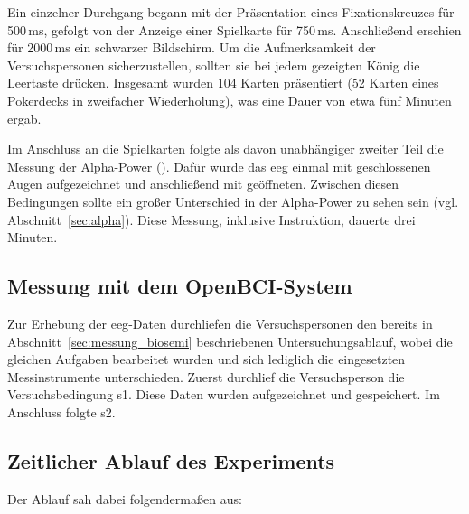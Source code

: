 Ein einzelner Durchgang begann mit der Präsentation eines Fixationskreuzes für 500\,ms, gefolgt von der Anzeige einer Spielkarte für 750\,ms. Anschließend erschien für 2000\,ms ein schwarzer Bildschirm. Um die Aufmerksamkeit der Versuchspersonen sicherzustellen, sollten sie bei jedem gezeigten König die Leertaste drücken. Insgesamt wurden 104 Karten präsentiert (52 Karten eines Pokerdecks in zweifacher Wiederholung), was eine Dauer von etwa fünf Minuten ergab.

Im Anschluss an die Spielkarten folgte als davon unabhängiger zweiter Teil die Messung der Alpha-Power (). Dafür wurde das \acrshort{eeg} einmal mit geschlossenen Augen aufgezeichnet und anschließend mit geöffneten. Zwischen diesen Bedingungen sollte ein großer Unterschied in der Alpha-Power zu sehen sein (vgl. Abschnitt~\ref{sec:alpha}). Diese Messung, inklusive Instruktion, dauerte drei Minuten.

    \subsection{Messung mit dem OpenBCI-System}

Zur Erhebung der \acrshort{eeg}-Daten durchliefen die Versuchspersonen den bereits in Abschnitt~\ref{sec:messung_biosemi} beschriebenen Untersuchungsablauf, wobei die gleichen Aufgaben bearbeitet wurden und sich lediglich die eingesetzten Messinstrumente unterschieden. Zuerst durchlief die Versuchsperson die Versuchsbedingung s1. Diese Daten wurden aufgezeichnet und gespeichert. Im Anschluss folgte s2.

    \subsection{Zeitlicher Ablauf des Experiments}

Der Ablauf sah dabei folgendermaßen aus: 

